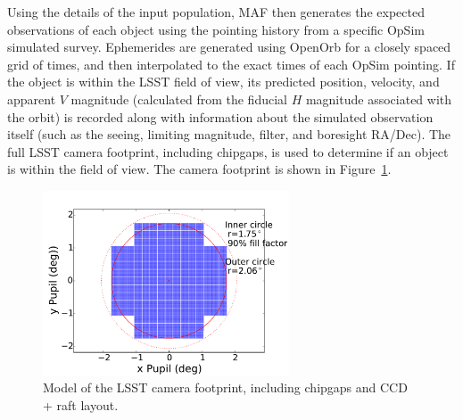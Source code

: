 Using the details of the input population, MAF then generates the expected observations of each object using the pointing history from a specific OpSim simulated survey. Ephemerides are generated using OpenOrb \citep{OpenOrb2009} for a closely spaced grid of times, and then interpolated to the exact times of each OpSim pointing. If the object is within the LSST field of view, its predicted position, velocity, and apparent $V$ magnitude (calculated from the fiducial $H$ magnitude associated with the orbit) is recorded along with information about the simulated observation itself (such as the seeing, limiting magnitude, filter, and boresight RA/Dec). The full LSST camera footprint, including chipgaps, is used to determine if an object is within the field of view. The camera footprint is shown in Figure~\ref{fig:camera_footprint}.

\begin{figure}
\centering
\includegraphics[width=0.65\textwidth]{figures/focalplane} 
\caption{Model of the LSST camera footprint, including chipgaps and CCD + raft layout. \label{fig:camera_footprint}}
\end{figure}

